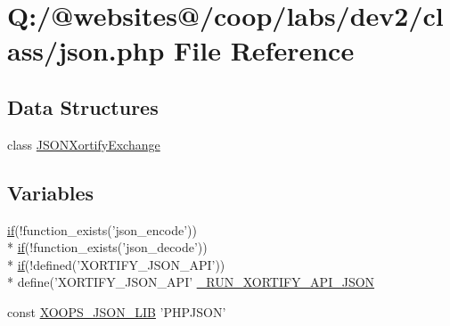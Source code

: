\hypertarget{class_2json_8php}{\section{Q\-:/@websites@/coop/labs/dev2/class/json.php File Reference}
\label{class_2json_8php}
}
\subsection*{Data Structures}
\begin{DoxyCompactItemize}
\item 
class \hyperlink{class_j_s_o_n_xortify_exchange}{J\-S\-O\-N\-Xortify\-Exchange}
\end{DoxyCompactItemize}
\subsection*{Variables}
\begin{DoxyCompactItemize}
\item 
\hyperlink{index_8php_ae2ccdf355624402b65fc2226f2a661cd}{if}(!function\-\_\-exists('json\-\_\-encode')) \\*
\hyperlink{index_8php_ae2ccdf355624402b65fc2226f2a661cd}{if}(!function\-\_\-exists('json\-\_\-decode')) \\*
\hyperlink{index_8php_ae2ccdf355624402b65fc2226f2a661cd}{if}(!defined('X\-O\-R\-T\-I\-F\-Y\-\_\-\-J\-S\-O\-N\-\_\-\-A\-P\-I')) \\*
define('X\-O\-R\-T\-I\-F\-Y\-\_\-\-J\-S\-O\-N\-\_\-\-A\-P\-I' \hyperlink{class_2json_8php_a03912c264c3f302d27b6431153308fc7}{\-\_\-\-R\-U\-N\-\_\-\-X\-O\-R\-T\-I\-F\-Y\-\_\-\-A\-P\-I\-\_\-\-J\-S\-O\-N}
\item 
const \hyperlink{class_2json_8php_a42fbc26b113afc08a5757bacf456cd8a}{X\-O\-O\-P\-S\-\_\-\-J\-S\-O\-N\-\_\-\-L\-I\-B} 'P\-H\-P\-J\-S\-O\-N'
\end{DoxyCompactItemize}


